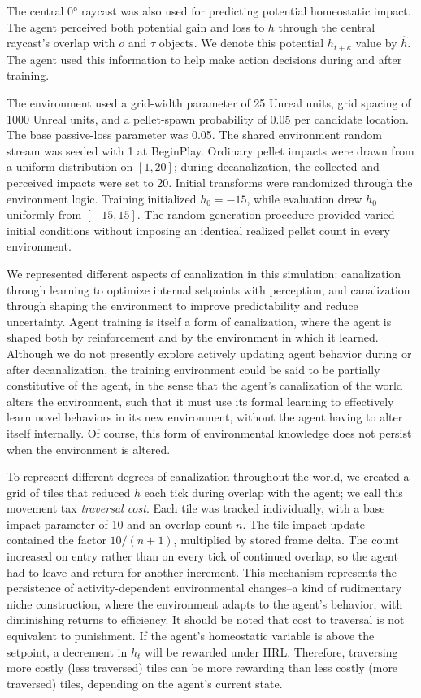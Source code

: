 \documentclass[12pt,fleqn]{article}
\begin{document}
The central 0° raycast was also used for predicting potential homeostatic impact. The agent perceived both potential gain and loss to \(h\) through the central raycast's  overlap with \(o\) and \(\tau\) objects. We denote this potential \(h_{t+\kappa}\) value by \(\hat{h}\). The agent used this information to help make action decisions during and after training.

The environment used a grid-width parameter of 25 Unreal units, grid spacing of 1000 Unreal units, and a pellet-spawn probability of 0.05 per candidate location. The base passive-loss parameter was 0.05. The shared environment random stream was seeded with 1 at BeginPlay. Ordinary pellet impacts were drawn from a uniform distribution on $[1,20]$; during decanalization, the collected and perceived impacts were set to 20. Initial transforms were randomized through the environment logic. Training initialized $h_0=-15$, while evaluation drew $h_0$ uniformly from $[-15,15]$. The random generation procedure provided varied initial conditions without imposing an identical realized pellet count in every environment.

We represented different aspects of canalization in this simulation: canalization through learning to optimize internal setpoints with perception, and canalization through shaping the environment to improve predictability and reduce uncertainty. Agent training is itself a form of canalization, where the agent is shaped both by reinforcement and by the environment in which it learned. Although we do not presently explore actively updating agent behavior during or after decanalization, the training environment could be said to be partially constitutive of the agent, in the sense that the agent's canalization of the world alters the environment, such that it must use its formal learning to effectively learn novel behaviors in its new environment, without the agent having to alter itself internally. Of course, this form of environmental knowledge does not persist when the environment is altered.

To represent different degrees of canalization throughout the world, we created a grid of tiles that reduced \(h\) each tick during overlap with the agent; we call this movement tax \emph{traversal cost}. Each tile was tracked individually, with a base impact parameter of 10 and an overlap count \(n\). The tile-impact update contained the factor $10/(n+1)$, multiplied by stored frame delta. The count increased on entry rather than on every tick of continued overlap, so the agent had to leave and return for another increment. This mechanism represents the persistence of activity-dependent environmental changes--a kind of rudimentary niche construction, where the environment adapts to the agent's behavior, with diminishing returns to efficiency. It should be noted that cost to traversal is not equivalent to punishment. If the agent's homeostatic variable is above the setpoint, a decrement in \(h_t\) will be rewarded under HRL. Therefore, traversing more costly (less traversed) tiles can be more rewarding than less costly (more traversed) tiles, depending on the agent's current state.
\end{document}
